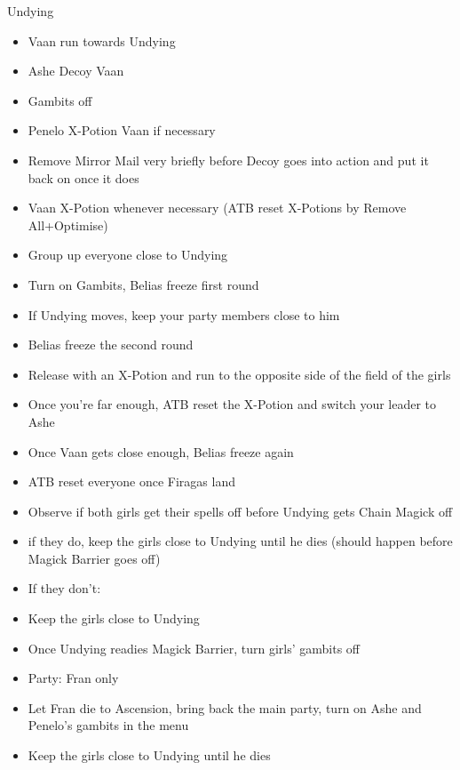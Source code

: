 \begin{battle}{Undying}
	\begin{itemize}
		\item  Vaan run towards Undying
		\item  Ashe Decoy Vaan
		\item  Gambits off
		\item  Penelo X-Potion Vaan if necessary
		\item  Remove Mirror Mail very briefly before Decoy goes into action and put it back on once it does
		\item  Vaan X-Potion whenever necessary (ATB reset X-Potions by Remove All+Optimise)
		\item  Group up everyone close to Undying
		\item  Turn on Gambits, Belias freeze first round
		\item  If Undying moves, keep your party members close to him
		\item  Belias freeze the second round
		\item  Release with an X-Potion and run to the opposite side of the field of the girls
		\item  Once you're far enough, ATB reset the X-Potion and switch your leader to Ashe
		\item  Once Vaan gets close enough, Belias freeze again
		\item  ATB reset everyone once Firagas land
		\item  Observe if both girls get their spells off before Undying gets Chain Magick off
		\item  if they do, keep the girls close to Undying until he dies (should happen before Magick Barrier goes off)
		\item  If they don't:
		\item  Keep the girls close to Undying
		\item  Once Undying readies Magick Barrier, turn girls' gambits off
		\item  Party: Fran only
		\item  Let Fran die to Ascension, bring back the main party, turn on Ashe and Penelo's gambits in the menu
		\item  Keep the girls close to Undying until he dies
	\end{itemize}

\end{battle}